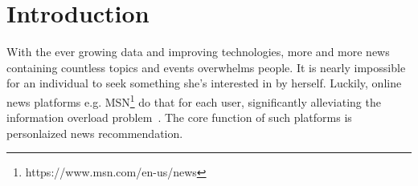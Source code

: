 \documentclass[sigconf,anonymous]{acmart}
\begin{document}


\keywords{}

\maketitle

\section{Introduction}
\label{section:introduction}
With the ever growing data and improving technologies, more and more news containing countless topics and events overwhelms people. It is nearly impossible for an individual to seek something she's interested in by herself. Luckily, online news platforms e.g. MSN\footnote{https://www.msn.com/en-us/news} do that for each user, significantly alleviating the information overload problem~\cite{personalized_news_recommendation}. The core function of such platforms is personlaized news recommendation.
\end{document}

